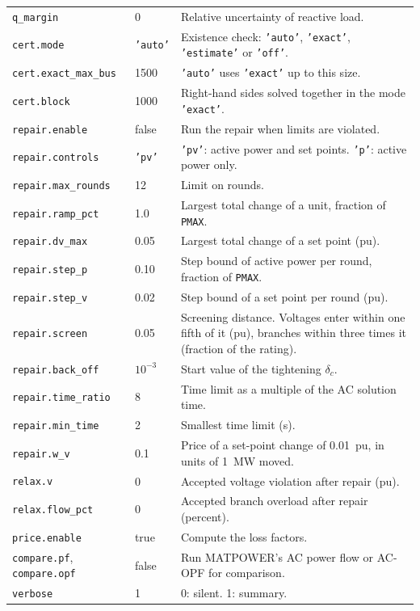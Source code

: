 \documentclass[a4paper,11pt]{article}
\newcommand{\opt}[1]{\texttt{#1}}
\begin{document}
\begin{longtable}{@{}p{4.2cm}p{2.0cm}p{8.6cm}@{}}
\opt{q\_margin} & 0 & Relative uncertainty of reactive load. \\
\opt{cert.mode} & \texttt{'auto'} & Existence check: \texttt{'auto'}, \texttt{'exact'}, \texttt{'estimate'} or \texttt{'off'}. \\
\opt{cert.exact\_max\_bus} & 1500 & \texttt{'auto'} uses \texttt{'exact'} up to this size. \\
\opt{cert.block} & 1000 & Right-hand sides solved together in the mode \texttt{'exact'}. \\
\opt{repair.enable} & false & Run the repair when limits are violated. \\
\opt{repair.controls} & \texttt{'pv'} & \texttt{'pv'}: active power and set points. \texttt{'p'}: active power only. \\
\opt{repair.max\_rounds} & 12 & Limit on rounds. \\
\opt{repair.ramp\_pct} & 1.0 & Largest total change of a unit, fraction of \texttt{PMAX}. \\
\opt{repair.dv\_max} & 0.05 & Largest total change of a set point (pu). \\
\opt{repair.step\_p} & 0.10 & Step bound of active power per round, fraction of \texttt{PMAX}. \\
\opt{repair.step\_v} & 0.02 & Step bound of a set point per round (pu). \\
\opt{repair.screen} & 0.05 & Screening distance. Voltages enter within one fifth of it (pu), branches within three times it (fraction of the rating). \\
\opt{repair.back\_off} & $10^{-3}$ & Start value of the tightening $\delta_c$. \\
\opt{repair.time\_ratio} & 8 & Time limit as a multiple of the AC solution time. \\
\opt{repair.min\_time} & 2 & Smallest time limit (s). \\
\opt{repair.w\_v} & 0.1 & Price of a set-point change of 0.01~pu, in units of 1~MW moved. \\
\opt{relax.v} & 0 & Accepted voltage violation after repair (pu). \\
\opt{relax.flow\_pct} & 0 & Accepted branch overload after repair (percent). \\
\opt{price.enable} & true & Compute the loss factors. \\
\opt{compare.pf}, \opt{compare.opf} & false & Run MATPOWER's AC power flow or AC-OPF for comparison. \\
\opt{verbose} & 1 & 0: silent. 1: summary. \\
\bottomrule
\end{longtable}
\end{document}

